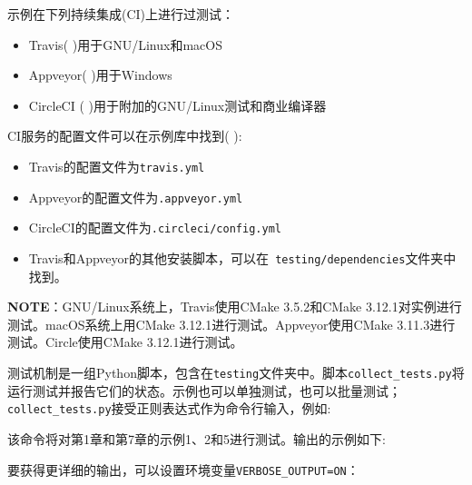 示例在下列持续集成(CI)上进行过测试：

\begin{itemize}
\item Travis(  )用于GNU/Linux和macOS

\item Appveyor(  )用于Windows

\item CircleCI (  )用于附加的GNU/Linux测试和商业编译器

\end{itemize}

CI服务的配置文件可以在示例库中找到(  ):

\begin{itemize}
\item Travis的配置文件为\texttt{travis.yml}

\item Appveyor的配置文件为\texttt{.appveyor.yml}

\item CircleCI的配置文件为\texttt{.circleci/config.yml}

\item Travis和Appveyor的其他安装脚本，可以在\texttt{ testing/dependencies}文件夹中找到。

\end{itemize}

\begin{myInfoBox}
\textbf{NOTE}：GNU/Linux系统上，Travis使用CMake 3.5.2和CMake 3.12.1对实例进行测试。macOS系统上用CMake 3.12.1进行测试。Appveyor使用CMake 3.11.3进行测试。Circle使用CMake 3.12.1进行测试。
\end{myInfoBox}

测试机制是一组Python脚本，包含在\texttt{testing}文件夹中。脚本\texttt{collect\_tests.py}将运行测试并报告它们的状态。示例也可以单独测试，也可以批量测试；\texttt{ collect\_tests.py}接受正则表达式作为命令行输入，例如:


该命令将对第1章和第7章的示例1、2和5进行测试。输出的示例如下:


要获得更详细的输出，可以设置环境变量\texttt{VERBOSE\_OUTPUT=ON}：

